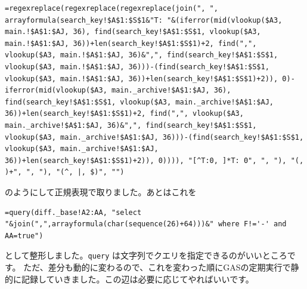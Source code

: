 \documentclass[a4paper]{ltjsreport}
\begin{document}
\begin{lstlisting}
=regexreplace(regexreplace(regexreplace(join(", ", arrayformula(search_key!$A$1:$S$1&"T: "&(iferror(mid(vlookup($A3, main.!$A$1:$AJ, 36), find(search_key!$A$1:$S$1, vlookup($A3, main.!$A$1:$AJ, 36))+len(search_key!$A$1:$S$1)+2, find(",", vlookup($A3, main.!$A$1:$AJ, 36)&",", find(search_key!$A$1:$S$1, vlookup($A3, main.!$A$1:$AJ, 36)))-(find(search_key!$A$1:$S$1, vlookup($A3, main.!$A$1:$AJ, 36))+len(search_key!$A$1:$S$1)+2)), 0)-iferror(mid(vlookup($A3, main._archive!$A$1:$AJ, 36), find(search_key!$A$1:$S$1, vlookup($A3, main._archive!$A$1:$AJ, 36))+len(search_key!$A$1:$S$1)+2, find(",", vlookup($A3, main._archive!$A$1:$AJ, 36)&",", find(search_key!$A$1:$S$1, vlookup($A3, main._archive!$A$1:$AJ, 36)))-(find(search_key!$A$1:$S$1, vlookup($A3, main._archive!$A$1:$AJ, 36))+len(search_key!$A$1:$S$1)+2)), 0)))), "[^T:0, ]*T: 0", ", "), "(, )+", ", "), "(^, |, $)", "")
\end{lstlisting}

のようにして正規表現で取りました。あとはこれを

\begin{lstlisting}
=query(diff._base!A2:AA, "select "&join(",",arrayformula(char(sequence(26)+64)))&" where F!='-' and AA=true")
\end{lstlisting}

として整形しました。\texttt{query} は文字列でクエリを指定できるのがいいところです。
ただ、差分も動的に変わるので、これを変わった順にGASの定期実行で静的に記録していきました。この辺は必要に応じてやればいいです。
\end{document}

